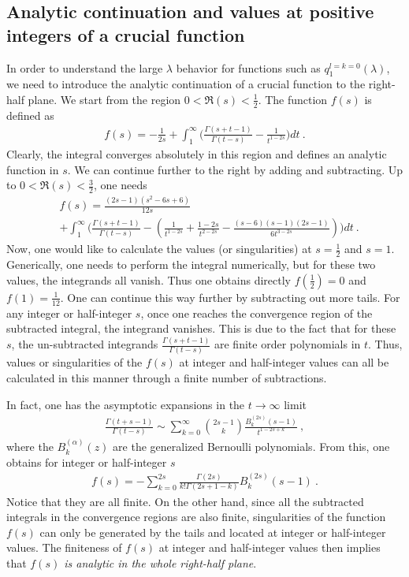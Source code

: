 \documentclass[a4paper,11pt]{article}
\begin{document}
\subsection{Analytic continuation and values at positive integers of a crucial function}\label{sec:anay}
In order to understand the large $\lambda$ behavior for functions such as $q_1^{l=k=0}(\lambda)$, we need to introduce the analytic continuation of a crucial function to the right-half plane. We start from the region $0<{\Re}(s)<\frac{1}{2}$. The function $f(s)$ is defined as
\begin{align}
f(s)=-\frac{1}{2s}+\int_{1}^{\infty}  \bigg(\frac{\Gamma(s+t-1)}{\Gamma(t-s)}-\frac{1}{t^{1-2s}}\bigg)dt \ .
\end{align}
Clearly, the integral converges absolutely in this region and defines an analytic function in $s$. We can continue further to the right by adding and subtracting. Up to $0<{\Re}(s)<\frac{3}{2}$, one needs
\begin{align}
&f(s)=\frac{(2 s-1) (s^2-6s+6)}{12 s}\nonumber \\ 
&+\int_{1}^{\infty}  \bigg(\frac{\Gamma(s+t-1)}{\Gamma(t-s)}-\left(\frac{1}{t^{1-2s}}+\frac{1-2 s}{t^{2-2s}}-\frac{(s-6) (s-1) (2 s-1)}{6 t^{3-2s}}\right) \bigg)dt \ .
\end{align}
Now, one would like to calculate the values (or singularities) at $s=\frac{1}{2}$ and $s=1$. Generically, one needs to perform the integral numerically, but for these two values, the integrands all vanish. Thus one obtains directly $f\left(\frac{1}{2}\right)=0$ and $f\left(1\right)=\frac{1}{12}$. One can continue this way further by subtracting out more tails. For any integer or half-integer $s$, once one reaches the convergence region of the subtracted integral, the integrand vanishes. This is due to the fact that for these $s$, the un-subtracted integrands $\frac{\Gamma(s+t-1)}{\Gamma(t-s)}$ are finite order polynomials in $t$. Thus, values or singularities of the $f(s)$ at integer and half-integer values can all be calculated in this manner through a finite number of subtractions. 

In fact, one has the asymptotic expansions in the $t\rightarrow \infty$ limit
\begin{align}
\frac{\Gamma(t+s-1)}{\Gamma(t-s)}\sim \sum_{k=0}^{\infty}\binom{2s-1}{k}\frac{B_k^{(2s)}(s-1)}{t^{1-2s+k}} \ ,
\end{align}
where the $B_k^{(\alpha)}(z)$ are the generalized Bernoulli polynomials.  From this, one obtains for integer or half-integer $s$
\begin{align}
f(s)=-\sum_{k=0}^{2s}\frac{\Gamma(2s)}{k!\Gamma(2s+1-k)}B_k^{(2s)}(s-1) \ .
\end{align}
Notice that they are all finite. On the other hand, since all the subtracted integrals in the convergence regions are also finite, singularities of the function $f(s)$ can only be generated by the tails and located at integer or half-integer values. The finiteness of $f(s)$ at integer and half-integer values then implies that {\it $f(s)$ is analytic in the whole right-half plane}. 
\end{document}
